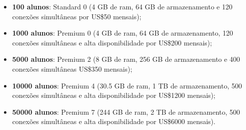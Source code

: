 \begin{itemize}
    \item \textbf{100 alunos}: Standard 0 (4 GB de \ac{ram}, 64 GB de armazenamento e 120 conexões simultâneas por US\$50 mensais);
    \item \textbf{1000 alunos}: Premium 0 (4 GB de \ac{ram}, 64 GB de armazenamento, 120 conexões simultâneas e alta disponibilidade por US\$200 mensais);
    \item \textbf{5000 alunos}: Premium 2 (8 GB de \ac{ram}, 256 GB de armazenamento e 400 conexões simultâneas US\$350 mensais);
    \item \textbf{10000 alunos}: Premium 4 (30.5 GB de \ac{ram}, 1 TB de armazenamento, 500 conexões simultâneas e alta disponibilidade por US\$1200 mensais);
    \item \textbf{50000 alunos}: Premium 7 (244 GB de \ac{ram}, 2 TB de armazenamento, 500 conexões simultâneas e alta disponibilidade por US\$6000 mensais).
\end{itemize}